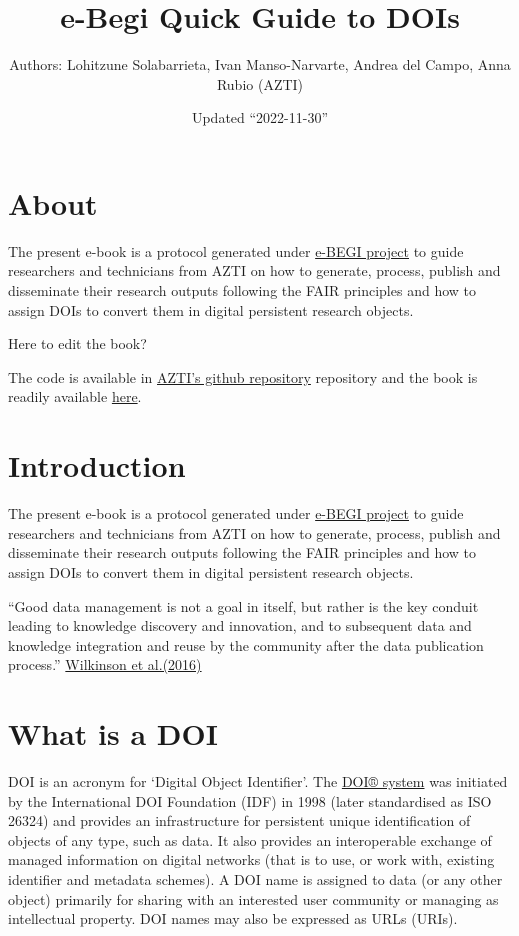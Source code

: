\documentclass[
]{book}
\title{e-Begi Quick Guide to DOIs}
\author{Authors: Lohitzune Solabarrieta, Ivan Manso-Narvarte, Andrea del Campo, Anna Rubio (AZTI)}
\date{Updated ``2022-11-30''}
\begin{document}
\maketitle

{
\setcounter{tocdepth}{1}
\tableofcontents
}
\hypertarget{about}{%
\chapter*{About}\label{about}}

The present e-book is a protocol generated under \href{https://www.azti.es/proyectos/ebegi/}{e-BEGI project} to guide researchers and technicians from AZTI on how to generate, process, publish and disseminate their research outputs following the FAIR principles and how to assign DOIs to convert them in digital persistent research objects.

Here to edit the book?

The code is available in \href{https://github.com/Fundacion-AZTI/ebegi_quickguide2DOIs}{AZTI's github repository} repository and the book is readily available \href{https://fundacion-azti.github.io/ebegi_quickguide2DOIs/docs/}{here}.

\hypertarget{introduction}{%
\chapter{Introduction}\label{introduction}}

The present e-book is a protocol generated under \href{https://www.azti.es/proyectos/ebegi/}{e-BEGI project} to guide researchers and technicians from AZTI on how to generate, process, publish and disseminate their research outputs following the FAIR principles and how to assign DOIs to convert them in digital persistent research objects.

``Good data management is not a goal in itself, but rather is the key conduit leading to knowledge discovery and innovation, and to subsequent data and knowledge integration and reuse by the community after the data publication process.'' \href{https://www.nature.com/articles/sdata201618}{Wilkinson et al.(2016)}

\hypertarget{what-is-a-doi}{%
\chapter{What is a DOI}\label{what-is-a-doi}}

DOI is an acronym for `Digital Object Identifier'. The \href{https://www.doi.org/}{DOI® system} was initiated by the International DOI Foundation (IDF) in 1998 (later standardised as ISO 26324) and provides an infrastructure for persistent unique identification of objects of any type, such as data. It also provides an interoperable exchange of managed information on digital networks (that is to use, or work with, existing identifier and metadata schemes). A DOI name is assigned to data (or any other object) primarily for sharing with an interested user community or managing as intellectual property. DOI names may also be expressed as URLs (URIs).
\end{document}
